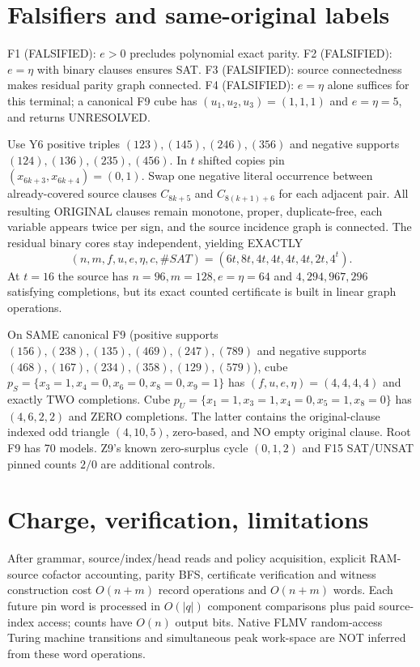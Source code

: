 \documentclass[11pt]{article}
\begin{document}
\section{Falsifiers and same-original labels}
F1 (FALSIFIED): $e>0$ precludes polynomial exact parity. F2 (FALSIFIED): $e=\eta$ with binary clauses ensures SAT. F3 (FALSIFIED): source connectedness makes residual parity graph connected. F4 (FALSIFIED): $e=\eta$ alone suffices for this terminal; a canonical F9 cube has $(u_1,u_2,u_3)=(1,1,1)$ and $e=\eta=5$, and returns UNRESOLVED.

Use Y6 positive triples $(123),(145),(246),(356)$ and negative supports $(124),(136),(235),(456)$. In $t$ shifted copies pin $(x_{6k+3},x_{6k+4})=(0,1)$. Swap one negative literal occurrence between already-covered source clauses $C_{8k+5}$ and $C_{8(k+1)+6}$ for each adjacent pair. All resulting ORIGINAL clauses remain monotone, proper, duplicate-free, each variable appears twice per sign, and the source incidence graph is connected. The residual binary cores stay independent, yielding EXACTLY
\[
(n,m,f,u,e,\eta,c,\#SAT)=(6t,8t,4t,4t,4t,4t,2t,4^t).
\]
At $t=16$ the source has $n=96,m=128,e=\eta=64$ and $4,294,967,296$ satisfying completions, but its exact counted certificate is built in linear graph operations.

On SAME canonical F9 (positive supports $(156),(238),(135),(469),(247),(789)$ and negative supports $(468),(167),(234),(358),(129),(579)$), cube $p_S=\{x_3=1,x_4=0,x_6=0,x_8=0,x_9=1\}$ has $(f,u,e,\eta)=(4,4,4,4)$ and exactly TWO completions. Cube $p_U=\{x_1=1,x_3=1,x_4=0,x_5=1,x_8=0\}$ has $(4,6,2,2)$ and ZERO completions. The latter contains the original-clause indexed odd triangle $(4,10,5)$, zero-based, and NO empty original clause. Root F9 has 70 models. Z9's known zero-surplus cycle $(0,1,2)$ and F15 SAT/UNSAT pinned counts $2/0$ are additional controls.
\section{Charge, verification, limitations}
After grammar, source/index/head reads and policy acquisition, explicit RAM-source cofactor accounting, parity BFS, certificate verification and witness construction cost $O(n+m)$ record operations and $O(n+m)$ words. Each future pin word is processed in $O(|q|)$ component comparisons plus paid source-index access; counts have $O(n)$ output bits. Native FLMV random-access Turing machine transitions and simultaneous peak work-space are NOT inferred from these word operations.
\end{document}
